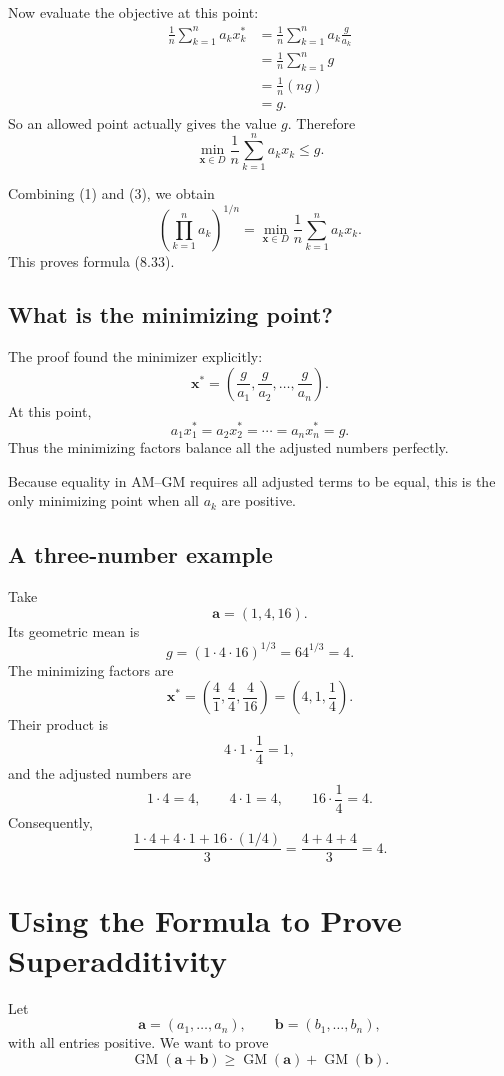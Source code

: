 \documentclass[11pt]{article}
\newcommand{\GM}{\operatorname{GM}}
\begin{document}
Now evaluate the objective at this point:
\begin{align*}
 \frac1n\sum_{k=1}^{n}a_kx_k^*
 &=\frac1n\sum_{k=1}^{n}a_k\frac{g}{a_k}\\
 &=\frac1n\sum_{k=1}^{n}g\\
 &=\frac1n(ng)\\
 &=g.
\end{align*}
So an allowed point actually gives the value $g$.  Therefore
\begin{equation*}
 \min_{\mathbf x\in D}
 \frac1n\sum_{k=1}^{n}a_kx_k
 \le g.
\tag{3}
\end{equation*}

Combining (1) and (3), we obtain
\[
 \boxed{
 \left(\prod_{k=1}^{n}a_k\right)^{1/n}
 =
 \min_{\mathbf x\in D}
 \frac1n\sum_{k=1}^{n}a_kx_k.
 }
\]
This proves formula (8.33).

\subsection{What is the minimizing point?}

The proof found the minimizer explicitly:
\[
 \boxed{
 \mathbf x^*
 =\left(
 \frac{g}{a_1},
 \frac{g}{a_2},
 \ldots,
 \frac{g}{a_n}
 \right).
 }
\]
At this point,
\[
 a_1x_1^*=a_2x_2^*=\cdots=a_nx_n^*=g.
\]
Thus the minimizing factors balance all the adjusted numbers perfectly.

Because equality in AM--GM requires all adjusted terms to be equal, this is the
only minimizing point when all $a_k$ are positive.

\subsection{A three-number example}

Take
\[
 \mathbf a=(1,4,16).
\]
Its geometric mean is
\[
 g=(1\cdot4\cdot16)^{1/3}=64^{1/3}=4.
\]
The minimizing factors are
\[
 \mathbf x^*
 =\left(\frac41,\frac44,\frac4{16}\right)
 =\left(4,1,\frac14\right).
\]
Their product is
\[
 4\cdot1\cdot\frac14=1,
\]
and the adjusted numbers are
\[
 1\cdot4=4,
 \qquad
 4\cdot1=4,
 \qquad
 16\cdot\frac14=4.
\]
Consequently,
\[
 \frac{1\cdot4+4\cdot1+16\cdot(1/4)}{3}
 =\frac{4+4+4}{3}=4.
\]

\section{Using the Formula to Prove Superadditivity}

Let
\[
 \mathbf a=(a_1,\ldots,a_n),
 \qquad
 \mathbf b=(b_1,\ldots,b_n),
\]
with all entries positive.  We want to prove
\[
 \GM(\mathbf a+\mathbf b)
 \ge
 \GM(\mathbf a)+\GM(\mathbf b).
\]
\end{document}
